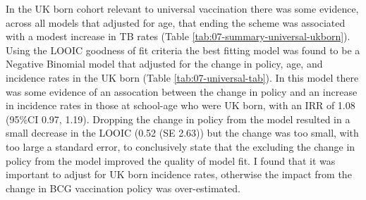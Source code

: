 \documentclass[11pt,twoside]{bristolthesis}
\begin{document}
  In the UK born cohort relevant to universal vaccination there was some evidence, across all models that adjusted for age, that ending the scheme was associated with a modest increase in TB rates (Table \ref{tab:07-summary-universal-ukborn}). Using the LOOIC goodness of fit criteria the best fitting model was found to be a Negative Binomial model that adjusted for the change in policy, age, and incidence rates in the UK born (Table \ref{tab:07-universal-tab}). In this model there was some evidence of an assocation between the change in policy and an increase in incidence rates in those at school-age who were UK born, with an IRR of 1.08 (95\%CI 0.97, 1.19). Dropping the change in policy from the model resulted in a small decrease in the LOOIC (0.52 (SE 2.63)) but the change was too small, with too large a standard error, to conclusively state that the excluding the change in policy from the model improved the quality of model fit. I found that it was important to adjust for UK born incidence rates, otherwise the impact from the change in BCG vaccination policy was over-estimated.
  
\end{document}
